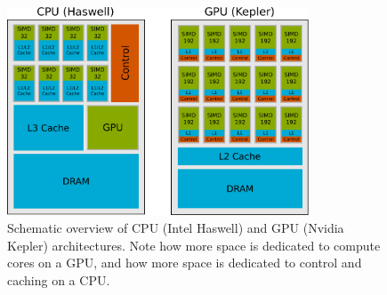 \begin{figure}
\centering
\includegraphics[width=0.8\textwidth]{img/CPU-GPU.pdf}
\caption{Schematic overview of CPU (Intel Haswell) and GPU (Nvidia Kepler) architectures. Note how more space is dedicated to compute cores on a GPU, and how more space is dedicated to control and caching on a CPU.}
\label{fig:cpu_gpu}
\end{figure}

